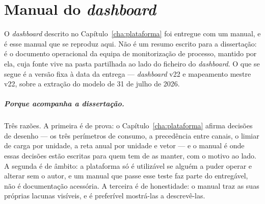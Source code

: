 
\chapter{Manual do \emph{dashboard}}
\label{app:manual}

O \emph{dashboard} descrito no Capítulo~\ref{cha:plataforma} foi entregue com
um manual, e é esse manual que se reproduz aqui. Não é um resumo escrito para
a dissertação: é o documento operacional da equipa de monitorização de
processo, mantido por ela, cuja fonte vive na pasta partilhada ao lado do
ficheiro do \emph{dashboard}. O que se segue é a versão fixa à data da
entrega --- \emph{dashboard} v22 e mapeamento mestre v22, sobre a extração do
modelo de 31 de julho de 2026.

\paragraph{Porque acompanha a dissertação.} Três razões. A primeira é de
prova: o Capítulo~\ref{cha:plataforma} afirma decisões de desenho --- os três
perímetros de consumo, a precedência entre canais, o limiar de carga por
unidade, a reta anual por unidade e vetor --- e o manual é onde essas
decisões estão escritas para quem tem de as manter, com o motivo ao lado. A
segunda é de âmbito: a plataforma só é utilizável se alguém a puder operar e
alterar sem o autor, e um manual que passe esse teste faz parte do
entregável, não é documentação acessória. A terceira é de honestidade: o
manual traz as suas próprias lacunas visíveis, e é preferível mostrá-las a
descrevê-las.

